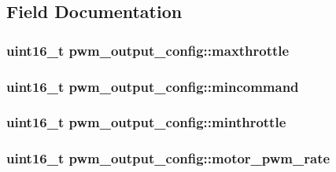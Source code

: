 \subsection{Field Documentation}
\hypertarget{structpwm__output__config_a2f58b9ab1046db9a4878377054fed2d6}{
\subsubsection[{maxthrottle}]{\setlength{\rightskip}{0pt plus 5cm}uint16\+\_\+t pwm\+\_\+output\+\_\+config\+::maxthrottle}}\label{structpwm__output__config_a2f58b9ab1046db9a4878377054fed2d6}
\hypertarget{structpwm__output__config_a19bd13cf35e997daff890073f7185bdc}{
\subsubsection[{mincommand}]{\setlength{\rightskip}{0pt plus 5cm}uint16\+\_\+t pwm\+\_\+output\+\_\+config\+::mincommand}}\label{structpwm__output__config_a19bd13cf35e997daff890073f7185bdc}
\hypertarget{structpwm__output__config_a9c94e4bf433e5c48e8297ad30355d5fd}{
\subsubsection[{minthrottle}]{\setlength{\rightskip}{0pt plus 5cm}uint16\+\_\+t pwm\+\_\+output\+\_\+config\+::minthrottle}}\label{structpwm__output__config_a9c94e4bf433e5c48e8297ad30355d5fd}
\hypertarget{structpwm__output__config_ad8a6b768442b35978897563dd144456b}{
\subsubsection[{motor\+\_\+pwm\+\_\+rate}]{\setlength{\rightskip}{0pt plus 5cm}uint16\+\_\+t pwm\+\_\+output\+\_\+config\+::motor\+\_\+pwm\+\_\+rate}}\label{structpwm__output__config_ad8a6b768442b35978897563dd144456b}

